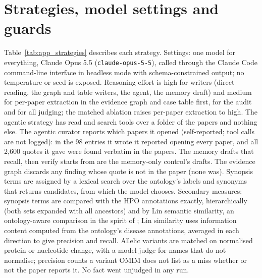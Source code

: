 \documentclass{article} %
\begin{document}
\section{Strategies, model settings and guards}
\label{app:settings}
Table~\ref{tab:app_strategies} describes each strategy. Settings: one model for everything, Claude Opus 5.5 (\texttt{claude-opus-5-5}), called through the Claude Code command-line interface in headless mode with schema-constrained output; no temperature or seed is exposed. Reasoning effort is high for writers (direct reading, the graph and table writers, the agent, the memory draft) and medium for per-paper extraction in the evidence graph and case table first, for the audit and for all judging; the matched ablation raises per-paper extraction to high. The agentic strategy has read and search tools over a folder of the papers and nothing else. The agentic curator reports which papers it opened (self-reported; tool calls are not logged): in the 98 entries it wrote it reported opening every paper, and all 2,600 quotes it gave were found verbatim in the papers. The memory drafts that recall, then verify starts from are the memory-only control's drafts. The evidence graph discards any finding whose quote is not in the paper (none was). Synopsis terms are assigned by a lexical search over the ontology's labels and synonyms that returns candidates, from which the model chooses. Secondary measures: synopsis terms are compared with the HPO annotations exactly, hierarchically (both sets expanded with all ancestors) and by Lin semantic similarity, an ontology-aware comparison in the spirit of \citet{Khler2009ClinicalDiagnostics}; Lin similarity uses information content computed from the ontology's disease annotations, averaged in each direction to give precision and recall. Allelic variants are matched on normalised protein or nucleotide change, with a model judge for names that do not normalise; precision counts a variant OMIM does not list as a miss whether or not the paper reports it. No fact went unjudged in any run.
\end{document}
